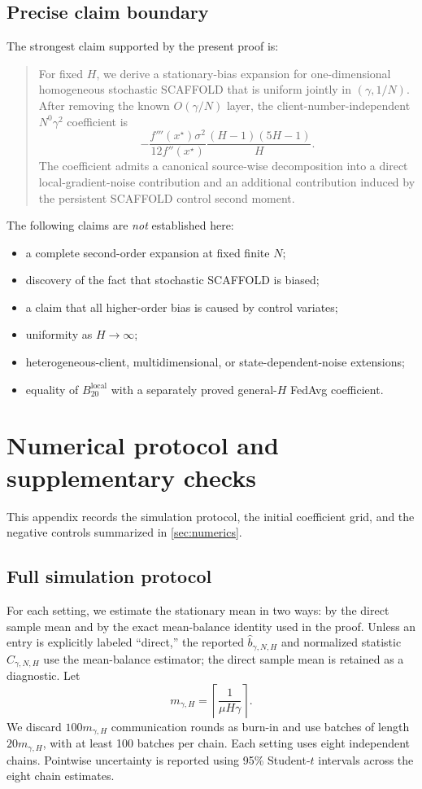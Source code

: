 \documentclass[11pt]{article}
\theoremstyle{definition}
\begin{document}
\subsection{Precise claim boundary}

The strongest claim supported by the present proof is:

\begin{quote}
For fixed $H$, we derive a stationary-bias expansion for one-dimensional homogeneous stochastic SCAFFOLD that is uniform jointly in $(\gamma,1/N)$. After removing the known $O(\gamma/N)$ layer, the client-number-independent $N^0\gamma^2$ coefficient is
\[
  -\frac{f'''(x^\star)\sigma^2}{12f''(x^\star)}
  \frac{(H-1)(5H-1)}{H}.
\]
The coefficient admits a canonical source-wise decomposition into a direct local-gradient-noise contribution and an additional contribution induced by the persistent SCAFFOLD control second moment.
\end{quote}

The following claims are \emph{not} established here:
\begin{itemize}
  \item a complete second-order expansion at fixed finite $N$;
  \item discovery of the fact that stochastic SCAFFOLD is biased;
  \item a claim that all higher-order bias is caused by control variates;
  \item uniformity as $H\to\infty$;
  \item heterogeneous-client, multidimensional, or state-dependent-noise extensions;
  \item equality of $B_{20}^{\mathrm{local}}$ with a separately proved general-$H$ FedAvg coefficient.
\end{itemize}

\section{Numerical protocol and supplementary checks}
\label{sec:numerical-supp}

This appendix records the simulation protocol, the initial coefficient grid, and the negative controls summarized in \cref{sec:numerics}.

\subsection{Full simulation protocol}

For each setting, we estimate the stationary mean in two ways: by the direct sample mean and by the exact mean-balance identity used in the proof. Unless an entry is explicitly labeled ``direct,'' the reported $\hat b_{\gamma, N,H}$ and normalized statistic $C_{\gamma, N,H}$ use the mean-balance estimator; the direct sample mean is retained as a diagnostic. Let
\[
m_{\gamma,H}=\left\lceil\frac{1}{\mu H\gamma}\right\rceil.
\]
We discard $100m_{\gamma, H}$ communication rounds as burn-in and use batches of length $20m_{\gamma, H}$, with at least 100 batches per chain. Each setting uses eight independent chains. Pointwise uncertainty is reported using 95\% Student-$t$ intervals across the eight chain estimates.
\end{document}
